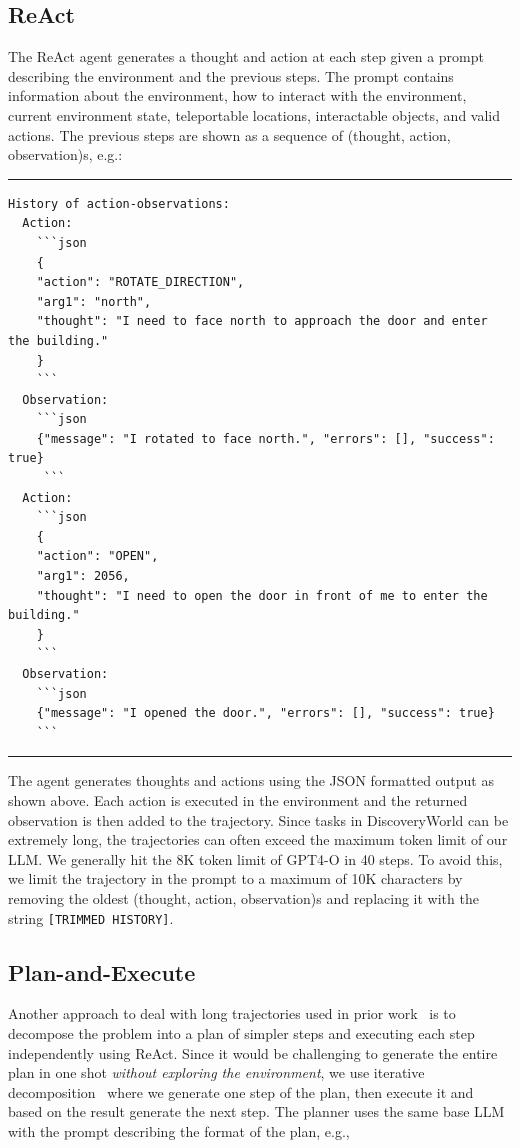 \subsection{ReAct}
The ReAct agent generates a thought and action at each step given a prompt describing the environment and the previous steps. The prompt contains information about the environment, how to interact with the environment, current environment state, teleportable locations, interactable objects, and valid actions. The previous steps are shown as a sequence of (thought, action, observation)s, e.g.:

\rule{\textwidth}{0.5pt}
\begin{footnotesize}
\begin{verbatim}
History of action-observations:
  Action:
    ```json
    {
    "action": "ROTATE_DIRECTION",
    "arg1": "north",
    "thought": "I need to face north to approach the door and enter the building."
    }
    ```
  Observation:
    ```json
    {"message": "I rotated to face north.", "errors": [], "success": true}
     ```
  Action:
    ```json
    {
    "action": "OPEN",
    "arg1": 2056,
    "thought": "I need to open the door in front of me to enter the building."
    }
    ```
  Observation:
    ```json
    {"message": "I opened the door.", "errors": [], "success": true}
    ```
\end{verbatim}
\end{footnotesize}
\rule{\textwidth}{0.5pt}

The agent generates thoughts and actions using the JSON formatted output as shown above. Each action is executed in the environment and the returned observation is then added to the trajectory. Since tasks in DiscoveryWorld can be extremely long, the trajectories can often exceed the maximum token limit of our LLM. We generally hit the 8K token limit of GPT4-O in 40 steps. To avoid this, we limit the trajectory in the prompt to a maximum of 10K characters by removing the oldest (thought, action, observation)s and replacing it with the string \texttt{[TRIMMED HISTORY]}.




\subsection{Plan-and-Execute}
Another approach to deal with long trajectories used in prior work~\cite{intercode,adapt} is to decompose the problem into a plan of simpler steps and executing each step independently using ReAct. Since it would be challenging to generate the entire plan in one shot \emph{without exploring the environment}, we use iterative decomposition~\cite{decomp} where we generate one step of the plan, then execute it and based on the result generate the next step. The planner uses the same base LLM with the prompt describing the format of the plan, e.g., 

